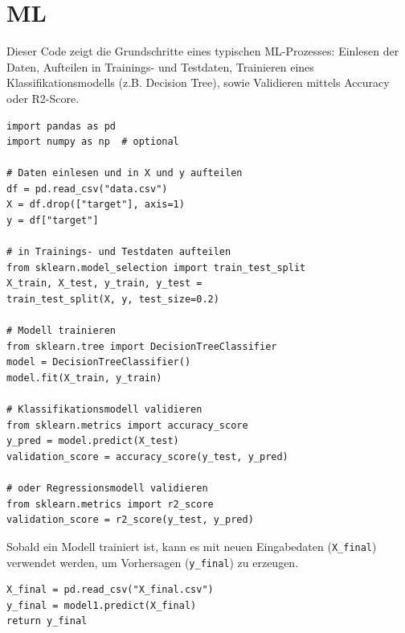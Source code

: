 \section{ML}\label{sec:08-ml}

\begin{contentbox}
Dieser Code zeigt die Grundschritte eines typischen ML-Prozesses: Einlesen der Daten, Aufteilen in Trainings- und Testdaten, Trainieren eines Klassifikationsmodells (z.B. Decision Tree), sowie Validieren mittels Accuracy oder R2-Score.
\end{contentbox}
\begin{codebox}
\begin{lstlisting}[style=CodeExpert]
import pandas as pd
import numpy as np  # optional

# Daten einlesen und in X und y aufteilen
df = pd.read_csv("data.csv")
X = df.drop(["target"], axis=1)
y = df["target"]

# in Trainings- und Testdaten aufteilen
from sklearn.model_selection import train_test_split
X_train, X_test, y_train, y_test =
train_test_split(X, y, test_size=0.2)

# Modell trainieren
from sklearn.tree import DecisionTreeClassifier
model = DecisionTreeClassifier()
model.fit(X_train, y_train)

# Klassifikationsmodell validieren
from sklearn.metrics import accuracy_score
y_pred = model.predict(X_test)
validation_score = accuracy_score(y_test, y_pred)

# oder Regressionsmodell validieren
from sklearn.metrics import r2_score
validation_score = r2_score(y_test, y_pred)
\end{lstlisting}
\end{codebox}

\begin{contentbox}
Sobald ein Modell trainiert ist, kann es mit neuen Eingabedaten (\texttt{X\_final}) verwendet werden, um Vorhersagen (\texttt{y\_final}) zu erzeugen.
\end{contentbox}
\begin{codebox}
\begin{lstlisting}[style=CodeExpert]
X_final = pd.read_csv("X_final.csv")
y_final = model1.predict(X_final)
return y_final
\end{lstlisting}
\end{codebox}

